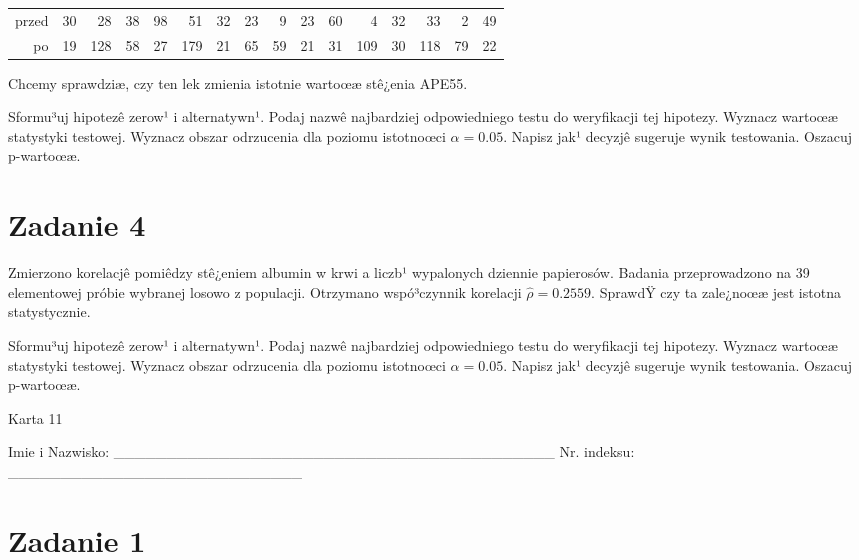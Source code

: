 \documentclass[a4paper,12pt]{article}
\begin{document}
  \vspace{0.5cm} 
  \noindent\begin{center} 
\begin{tabular}{rrrrrrrrrrrrrrrr}
  \hline
  \hline
przed & 30 & 28 & 38 & 98 & 51 & 32 & 23 & 9 & 23 & 60 & 4 & 32 & 33 & 2 & 49 \\
  po & 19 & 128 & 58 & 27 & 179 & 21 & 65 & 59 & 21 & 31 & 109 & 30 & 118 & 79 & 22 \\
   \hline
\end{tabular}
 
  \end{center} 
  \vspace{0.5cm}
  
  Chcemy sprawdziæ, czy ten lek zmienia istotnie wartoœæ stê¿enia APE55.
  
  Sformu³uj hipotezê zerow¹ i alternatywn¹. 
  Podaj nazwê najbardziej odpowiedniego testu do weryfikacji tej hipotezy. 
  Wyznacz wartoœæ statystyki testowej. 
  Wyznacz obszar odrzucenia dla poziomu istotnoœci $\alpha=0.05$. 
  Napisz jak¹ decyzjê sugeruje wynik testowania. Oszacuj p-wartoœæ. \vspace{1cm} 

  \section*{Zadanie 4}
     
     Zmierzono korelacjê pomiêdzy stê¿eniem albumin w krwi a liczb¹ wypalonych dziennie papierosów. 
     Badania przeprowadzono na 39 elementowej próbie wybranej losowo z populacji. 
     Otrzymano wspó³czynnik korelacji $\hat\rho = 0.2559 $. 
     SprawdŸ czy ta zale¿noœæ jest istotna statystycznie. 
     
     Sformu³uj hipotezê zerow¹ i alternatywn¹. 
     Podaj nazwê najbardziej odpowiedniego testu do weryfikacji tej hipotezy. 
     Wyznacz wartoœæ statystyki testowej. 
     Wyznacz obszar odrzucenia dla poziomu istotnoœci $\alpha=0.05$. 
     Napisz jak¹ decyzjê sugeruje wynik testowania. 
     Oszacuj p-wartoœæ. \vspace{1cm} 

  \clearpage  Karta  11  

 Imie i Nazwisko: \_\_\_\_\_\_\_\_\_\_\_\_\_\_\_\_\_\_\_\_\_\_\_\_\_\_\_\_\_\_\_\_\_\_\_\_\_\_\_\_\_\_ Nr. indeksu: \_\_\_\_\_\_\_\_\_\_\_\_\_\_\_\_\_\_\_\_\_\_\_\_\_\_\_\_ 
 \section*{Zadanie 1}
     
\end{document}
